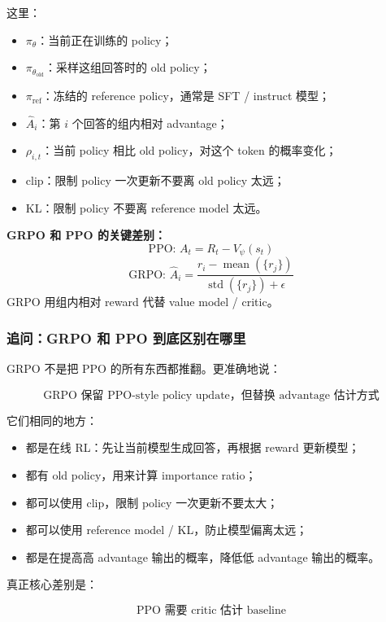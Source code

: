 这里：

\begin{itemize}[leftmargin=1.5em]
  \item $\pi_\theta$：当前正在训练的 policy；
  \item $\pi_{\theta_\text{old}}$：采样这组回答时的 old policy；
  \item $\pi_\text{ref}$：冻结的 reference policy，通常是 SFT / instruct 模型；
  \item $\hat{A}_i$：第 $i$ 个回答的组内相对 advantage；
  \item $\rho_{i,t}$：当前 policy 相比 old policy，对这个 token 的概率变化；
  \item clip：限制 policy 一次更新不要离 old policy 太远；
  \item KL：限制 policy 不要离 reference model 太远。
\end{itemize}

\begin{summarybox}
\textbf{GRPO 和 PPO 的关键差别：}
\[
\text{PPO: } A_t = R_t - V_\psi(s_t)
\]
\[
\text{GRPO: } \hat{A}_i = \frac{r_i - \operatorname{mean}(\{r_j\})}{\operatorname{std}(\{r_j\}) + \epsilon}
\]
GRPO 用组内相对 reward 代替 value model / critic。
\end{summarybox}

\subsubsection{追问：GRPO 和 PPO 到底区别在哪里}

GRPO 不是把 PPO 的所有东西都推翻。更准确地说：

\[
\text{GRPO 保留 PPO-style policy update，但替换 advantage 估计方式}
\]

它们相同的地方：

\begin{itemize}[leftmargin=1.5em]
  \item 都是在线 RL：先让当前模型生成回答，再根据 reward 更新模型；
  \item 都有 old policy，用来计算 importance ratio；
  \item 都可以使用 clip，限制 policy 一次更新不要太大；
  \item 都可以使用 reference model / KL，防止模型偏离太远；
  \item 都是在提高高 advantage 输出的概率，降低低 advantage 输出的概率。
\end{itemize}

真正核心差别是：

\[
\text{PPO 需要 critic 估计 baseline}
\]

